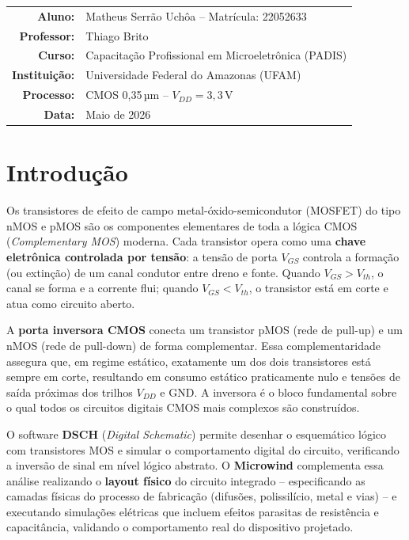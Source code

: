 \documentclass[12pt,a4paper]{article}
\begin{document}
\begin{titlepage}
  \begin{tabular}{rl}
    \textbf{Aluno:}       & Matheus Serrão Uchôa -- Matrícula: 22052633 \\[4pt]
    \textbf{Professor:}   & Thiago Brito \\[4pt]
    \textbf{Curso:}       & Capacitação Profissional em Microeletrônica (PADIS) \\[4pt]
    \textbf{Instituição:} & Universidade Federal do Amazonas (UFAM) \\[4pt]
    \textbf{Processo:}    & CMOS 0,35\,µm -- $V_{DD} = 3{,}3$\,V \\[4pt]
    \textbf{Data:}        & Maio de 2026
  \end{tabular}
\end{titlepage}

\tableofcontents
\newpage

\section{Introdução}

Os transistores de efeito de campo metal-óxido-semicondutor (MOSFET) do tipo
nMOS e pMOS são os componentes elementares de toda a lógica CMOS
(\textit{Complementary MOS}) moderna. Cada transistor opera como uma
\textbf{chave eletrônica controlada por tensão}: a tensão de porta $V_{GS}$
controla a formação (ou extinção) de um canal condutor entre dreno e fonte.
Quando $V_{GS} > V_{th}$, o canal se forma e a corrente flui; quando
$V_{GS} < V_{th}$, o transistor está em corte e atua como circuito aberto.

A \textbf{porta inversora CMOS} conecta um transistor pMOS (rede de pull-up)
e um nMOS (rede de pull-down) de forma complementar. Essa complementaridade
assegura que, em regime estático, exatamente um dos dois transistores está
sempre em corte, resultando em consumo estático praticamente nulo e tensões de
saída próximas dos trilhos $V_{DD}$ e GND. A inversora é o bloco fundamental
sobre o qual todos os circuitos digitais CMOS mais complexos são construídos.

O software \textbf{DSCH} (\textit{Digital Schematic}) permite desenhar o
esquemático lógico com transistores MOS e simular o comportamento digital do
circuito, verificando a inversão de sinal em nível lógico abstrato. O
\textbf{Microwind} complementa essa análise realizando o \textbf{layout físico}
do circuito integrado -- especificando as camadas físicas do processo de
fabricação (difusões, polissilício, metal e vias) -- e executando simulações
elétricas que incluem efeitos parasitas de resistência e capacitância, validando
o comportamento real do dispositivo projetado.
\end{document}
